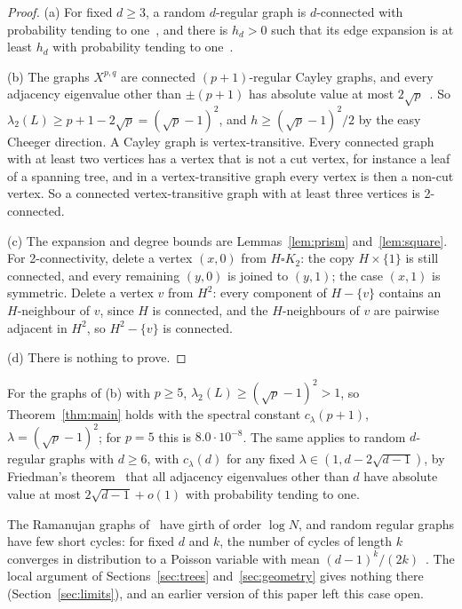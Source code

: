 \begin{proof}
(a) For fixed $d\ge3$, a random $d$-regular graph is $d$-connected with probability tending to one~\cite{Wormald81}, and there is $h_d>0$ such that its edge expansion is at least $h_d$ with probability tending to one~\cite{Bollobas88}.

(b) The graphs $X^{p,q}$ are connected $(p+1)$-regular Cayley graphs, and every adjacency eigenvalue other than $\pm(p+1)$ has absolute value at most $2\sqrt p$~\cite{LPS88}. So $\lambda_2(L)\ge p+1-2\sqrt p=(\sqrt p-1)^2$, and $h\ge(\sqrt p-1)^2/2$ by the easy Cheeger direction. A Cayley graph is vertex-transitive. Every connected graph with at least two vertices has a vertex that is not a cut vertex, for instance a leaf of a spanning tree, and in a vertex-transitive graph every vertex is then a non-cut vertex. So a connected vertex-transitive graph with at least three vertices is 2-connected.

(c) The expansion and degree bounds are Lemmas~\ref{lem:prism} and~\ref{lem:square}. For 2-connectivity, delete a vertex $(x,0)$ from $H\square K_2$: the copy $H\times\{1\}$ is still connected, and every remaining $(y,0)$ is joined to $(y,1)$; the case $(x,1)$ is symmetric. Delete a vertex $v$ from $H^2$: every component of $H-\{v\}$ contains an $H$-neighbour of $v$, since $H$ is connected, and the $H$-neighbours of $v$ are pairwise adjacent in $H^2$, so $H^2-\{v\}$ is connected.

(d) There is nothing to prove.
\end{proof}

For the graphs of (b) with $p\ge5$, $\lambda_2(L)\ge(\sqrt p-1)^2>1$, so Theorem~\ref{thm:main} holds with the spectral constant $c_\lambda(p+1)$, $\lambda=(\sqrt p-1)^2$; for $p=5$ this is $8.0\cdot10^{-8}$. The same applies to random $d$-regular graphs with $d\ge6$, with $c_\lambda(d)$ for any fixed $\lambda\in(1,d-2\sqrt{d-1})$, by Friedman's theorem~\cite{Friedman08} that all adjacency eigenvalues other than $d$ have absolute value at most $2\sqrt{d-1}+o(1)$ with probability tending to one.

The Ramanujan graphs of~\cite{LPS88} have girth of order $\log N$, and random regular graphs have few short cycles: for fixed $d$ and $k$, the number of cycles of length $k$ converges in distribution to a Poisson variable with mean $(d-1)^k/(2k)$~\cite{Wormald81cycles}. The local argument of Sections~\ref{sec:trees} and~\ref{sec:geometry} gives nothing there (Section~\ref{sec:limits}), and an earlier version of this paper left this case open.

